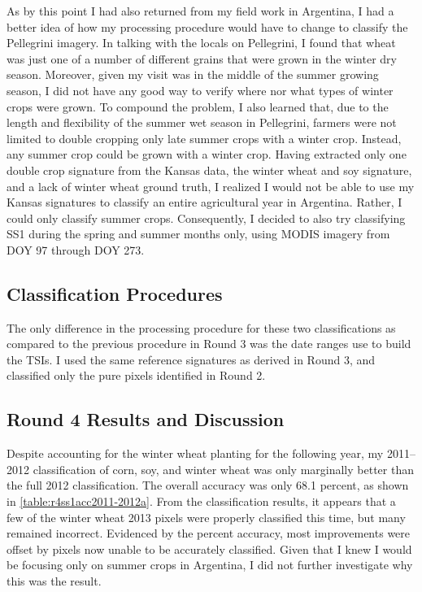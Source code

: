 
As by this point I had also returned from my field work in Argentina, I had a better idea of how my processing procedure would have to change to classify the Pellegrini imagery. In talking with the locals on Pellegrini, I found that wheat was just one of a number of different grains that were grown in the winter dry season. Moreover, given my visit was in the middle of the summer growing season, I did not have any good way to verify where nor what types of winter crops were grown. To compound the problem, I also learned that, due to the length and flexibility of the summer wet season in Pellegrini, farmers were not limited to double cropping only late summer crops with a winter crop. Instead, any summer crop could be grown with a winter crop. Having extracted only one double crop signature from the Kansas data, the winter wheat and soy signature, and a lack of winter wheat ground truth, I realized I would not be able to use my Kansas signatures to classify an entire agricultural year in Argentina. Rather, I could only classify summer crops. Consequently, I decided to also try classifying SS1 during the spring and summer months only, using MODIS imagery from DOY 97 through DOY 273.

\subsection*{Classification Procedures}

The only difference in the processing procedure for these two classifications as compared to the previous procedure in Round 3 was the date ranges use to build the TSIs. I used the same reference signatures as derived in Round 3, and classified only the pure pixels identified in Round 2.

\subsection*{Round 4 Results and Discussion}

Despite accounting for the winter wheat planting for the following year, my 2011--2012 classification of corn, soy, and winter wheat was only marginally better than the full 2012 classification. The overall accuracy was only 68.1 percent, as shown in \cref{table:r4ss1acc2011-2012a}. From the classification results, it appears that a few of the winter wheat 2013 pixels were properly classified this time, but many remained incorrect. Evidenced by the percent accuracy, most improvements were offset by pixels now unable to be accurately classified. Given that I knew I would be focusing only on summer crops in Argentina, I did not further investigate why this was the result.

